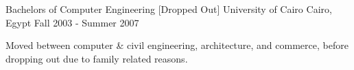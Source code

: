 

\begin{cventries}

  \cventry
    {Bachelors of Computer Engineering [Dropped Out]} %
    {University of Cairo} %
    {Cairo, Egypt} %
    {Fall 2003 - Summer 2007} %
    {
      \begin{cvitems} %
        \item {Moved between computer \& civil engineering, architecture, and commerce, before
          dropping out due to family related reasons.}
      \end{cvitems}
    }

\end{cventries}
